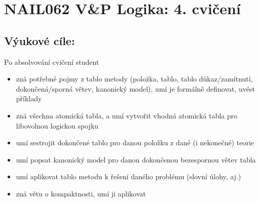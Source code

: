 \documentclass[a4paper,11pt]{amsart}
\begin{document}
\section*{NAIL062 V\&P Logika: 4. cvičení}



\subsection*{Výukové cíle:} Po absolvování cvičení student

    \begin{itemize}\setlength{\itemsep}{0pt}
        \item zná potřebné pojmy z tablo metody (položka, tablo, tablo důkaz/zamítnutí, dokončená/sporná větev, kanonický model), umí je formálně definovat, uvést příklady
        \item zná všechna atomická tabla, a umí vytvořit vhodná atomická tabla pro libovolnou logickou spojku
        \item umí sestrojit dokončené tablo pro danou položku z dané (i nekonečné) teorie
        \item umí popsat kanonický model pro danou dokončenou bezespornou větev tabla
        \item umí aplikovat tablo metodu k řešení daného problému (slovní úlohy, aj.)
        \item zná větu o kompaktnosti, umí ji aplikovat
    \end{itemize}
    
\end{document}

